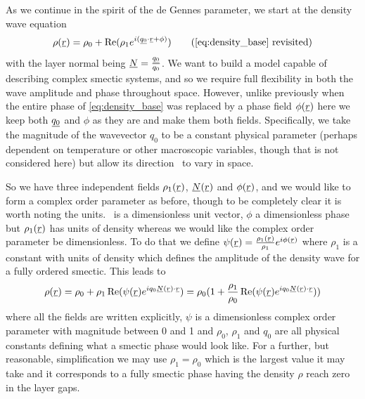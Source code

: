 \documentclass[12pt]{article}
\newcommand{\suf}[2]{\stackunder[0.5pt]{\stackunder[1pt]{\ensuremath{#1}}{\rule{\widthof{\ensuremath{#2}}*\real{0.9}}{.1ex}}}{}}
\newcommand{\su}[1]{\suf{#1}{#1}}
\newcommand{\ssu}[1]{\scriptsize\su{#1}\normalsize}
\newcommand{\NN}{\su{N}}
\begin{document}
As we continue in the spirit of the de Gennes parameter, we start at the density wave equation
\begin{equation*}
    \rho(\su{r}) = \rho_0 + \Re(\rho_1 e^{i(\ssu{q_0} \cdot \ssu{r} + \phi)}) \tag{\ref{eq:density_base} revisited}
\end{equation*}
with the layer normal being $\su{N} = \frac{\ssu{q_0}}{q_0}$.
We want to build a model capable of describing complex smectic systems, and so we require full flexibility in both the wave amplitude and phase throughout space.
However, unlike previously when the entire phase of \cref{eq:density_base} was replaced by a phase field $\phi(\su{r})$ here we keep both $\su{q_0}$ and $\phi$ as they are and make them both fields.
Specifically, we take the magnitude of the wavevector $q_0$ to be a constant physical parameter (perhaps dependent on temperature or other macroscopic variables, though that is not considered here) but allow its direction \NN\ to vary in space.

So we have three independent fields $\rho_1(\su{r})$, $\su{N}(\su{r})$ and $\phi(\su{r})$, and we would like to form a complex order parameter as before, though to be completely clear it is worth noting the units.
\NN\ is a dimensionless unit vector, $\phi$ a dimensionless phase but $\rho_1(\su{r})$ has units of density whereas we would like the complex order parameter be dimensionless.
To do that we define $\psi(\su{r}) = \frac{\rho_1(\ssu{r})}{\rho_1}e^{i\phi(\ssu{r})}$ where $\rho_1$ is a constant with units of density which defines the amplitude of the density wave for a fully ordered smectic.
This leads to
\begin{equation}
    \rho(\su{r}) = \rho_0 + \rho_1 \Re(\psi(\su{r}) e^{i q_0\ssu{N}(\ssu{r}) \cdot \ssu{r}}) = \rho_0(1 + \frac{\rho_1}{\rho_0} \Re(\psi(\su{r}) e^{i q_0\ssu{N}(\ssu{r}) \cdot \ssu{r}}))
\end{equation}
where all the fields are written explicitly, $\psi$ is a dimensionless complex order parameter with magnitude between 0 and 1 and $\rho_0$, $\rho_1$ and $q_0$ are all physical constants defining what a smectic phase would look like.
For a further, but reasonable, simplification we may use $\rho_1 = \rho_0$ which is the largest value it may take and it corresponds to a fully smectic phase having the density $\rho$ reach zero in the layer gaps.
\end{document}
